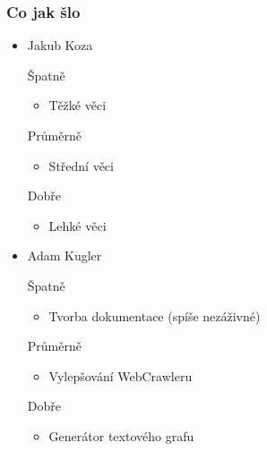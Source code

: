 \documentclass{beamer}
\begin{document}
\begin{frame}[allowframebreaks]\frametitle{Co jak šlo}
  \begin{itemize}
    \item Jakub Koza
     \begin{block}{Špatně} %
       \begin{itemize}
        \item Těžké věci
       \end{itemize}
     \end{block}
     \begin{block}{Průměrně} %
        \begin{itemize}
        \item Střední věci
       \end{itemize}
     \end{block}
     \begin{block}{Dobře} %
       \begin{itemize}
        \item Lehké věci
       \end{itemize}
     \end{block}
   
    \item Adam Kugler
      \begin{block}{Špatně} %
       \begin{itemize}
        \item Tvorba dokumentace (spíše nezáživné)
       \end{itemize}
     \end{block}
     \begin{block}{Průměrně} %
        \begin{itemize}
        \item Vylepšování WebCrawleru
       \end{itemize}
     \end{block}
     \begin{block}{Dobře} %
       \begin{itemize}
        \item Generátor textového grafu
       \end{itemize}
     \end{block}
  

\end{itemize}
\end{frame}
\end{document}
